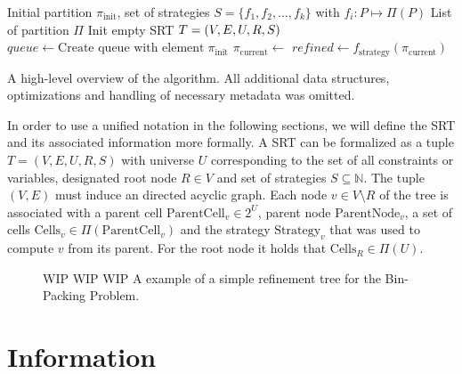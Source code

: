 		\begin{algorithm}
			\centering
			\begin{algorithmic}
				\Require Initial partition $\pi_{\mathrm{init}}$, set of strategies $S = \{ f_1, f_2, \ldots, f_k \}$ with $f_i: P \mapsto \Pi(P)$
				\Ensure List of partition $\Pi$
				\Statex
					\State Init empty \ac{SRT} $T = (V, E, U, R, S)$
					\State $queue \gets \text{Create queue with element} \; \pi_{\mathrm{init}}$
						\State $\pi_{\mathrm{current}} \gets$ 
								\State $refined \gets f_{\mathrm{strategy}}(\pi_{\mathrm{current}})$ 
								\State {}
							\EndFor
						\EndFor
					\EndWhile

				\EndFunction
			\end{algorithmic}
			\caption{A high-level overview of the algorithm. All additional data structures, optimizations and handling of necessary metadata was omitted.}
			\label{fig:tree:algo}
		\end{algorithm}

		In order to use a unified notation in the following sections, we will define the \ac{SRT} and its associated information more formally.
		A \ac{SRT} can be formalized as a tuple $T = (V, E, U, R, S)$ with universe $U$ corresponding to the set of all constraints or variables, designated root node $R \in V$ and set of strategies $S \subseteq \mathbb{N}$.
		The tuple $(V, E)$ must induce an directed acyclic graph.
		Each node $v \in V \setminus R$ of the tree is associated with a parent cell $\mathrm{ParentCell}_v \in 2^U$, parent node $\mathrm{ParentNode}_v$, a set of cells $\mathrm{Cells}_{v} \in \Pi(\mathrm{ParentCell}_v)$ and the strategy $\mathrm{Strategy}_v$ that was used to compute $v$ from its parent.
		For the root node it holds that $\mathrm{Cells}_R \in \Pi(U)$.

		\begin{figure}[ht!]
			\centering
			
			\caption{WIP WIP WIP A example of a simple refinement tree for the Bin-Packing Problem.}
			\label{fig:tree:motivation}
		\end{figure}

		\clearpage

	\section{Information}

